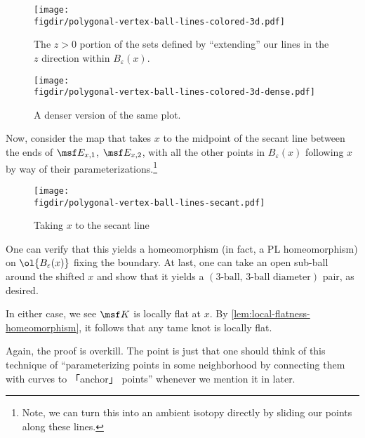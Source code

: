 \begin{sproof}
\begin{enumerate}[label=\arabic*)]
      \begin{figure}[H]
        \centering
        \texttt{[image: \\figdir/polygonal-vertex-ball-lines-colored-3d.pdf]}
        \caption[Lines extended to planes]{The $z>0$ portion of the
          sets defined by ``extending'' our lines in the $z$ direction
          within $B_\varepsilon(x)$.}
      \end{figure}
      \begin{figure}[H]
        \centering
        \texttt{[image: \\figdir/polygonal-vertex-ball-lines-colored-3d-dense.pdf]}
        \caption{A denser version of the same plot.}
      \end{figure}
      Now, consider the map that takes $x$ to the midpoint of the
      secant line between the ends of $\msf E_{x,1}$, $\msf E_{x,2}$,
      with all the other points in $B_\varepsilon(x)$ following $x$ by
      way of their parameterizations.\footnote{Note, we can turn this
      into an ambient isotopy directly by sliding our points along
      these lines.}
      \begin{figure}[H]
        \centering
        \texttt{[image: \\figdir/polygonal-vertex-ball-lines-secant.pdf]}
        \caption{Taking $x$ to the secant line}
      \end{figure}
      One can verify that this yields a homeomorphism (in fact, a PL
      homeomorphism) on $\ol{B_\varepsilon(x)}$ fixing the boundary.
      At last, one can take an open sub-ball around the shifted $x$
      and show that it yields a $(\text{3-ball, 3-ball diameter})$
      pair, as desired.
  \end{enumerate}
  In either case, we see $\msf K$ is locally flat at $x$. By
  \cref{lem:local-flatness-homeomorphism}, it follows that any tame
  knot is locally flat.
\end{sproof}
Again, the proof is overkill. The point is just that one should think
of this technique of ``parameterizing points in some neighborhood by
connecting them with curves to 「anchor」 points'' whenever we mention
it in later.

